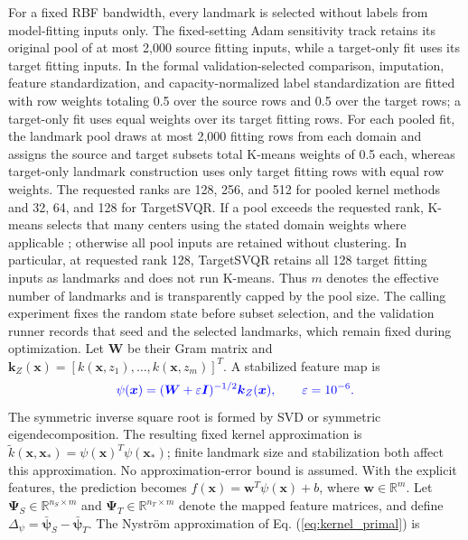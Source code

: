 \documentclass[a4paper]{cas-sc}
\begin{document}
{\color{blue}For a fixed RBF bandwidth, every landmark is selected without labels from model-fitting inputs only. The fixed-setting Adam sensitivity track retains its original pool of at most 2,000 source fitting inputs, while a target-only fit uses its target fitting inputs. In the formal validation-selected comparison, imputation, feature standardization, and capacity-normalized label standardization are fitted with row weights totaling 0.5 over the source rows and 0.5 over the target rows; a target-only fit uses equal weights over its target fitting rows. For each pooled fit, the landmark pool draws at most 2,000 fitting rows from each domain and assigns the source and target subsets total K-means weights of 0.5 each, whereas target-only landmark construction uses only target fitting rows with equal row weights. The requested ranks are 128, 256, and 512 for pooled kernel methods and 32, 64, and 128 for TargetSVQR. If a pool exceeds the requested rank, K-means selects that many centers using the stated domain weights where applicable \citep{zhang2010clustered}; otherwise all pool inputs are retained without clustering. In particular, at requested rank 128, TargetSVQR retains all 128 target fitting inputs as landmarks and does not run K-means. Thus $m$ denotes the effective number of landmarks and is transparently capped by the pool size. The calling experiment fixes the random state before subset selection, and the validation runner records that seed and the selected landmarks, which remain fixed during optimization. Let $\boldsymbol{W}$ be their Gram matrix and $\boldsymbol{k}_Z(\boldsymbol{x})=[k(\boldsymbol{x},z_1),\ldots,k(\boldsymbol{x},z_m)]^T$. A stabilized feature map is}
\begin{equation}
\label{eq:nystrom_feature}
{\color{blue}\psi(\boldsymbol{x})=(\boldsymbol{W}+\varepsilon\boldsymbol{I})^{-1/2}\boldsymbol{k}_Z(\boldsymbol{x}),\qquad \varepsilon=10^{-6}.}
\end{equation}
{\color{blue}The symmetric inverse square root is formed by SVD or symmetric eigendecomposition. The resulting fixed kernel approximation is $\widetilde{k}(\boldsymbol{x},\boldsymbol{x}_{*})=\psi(\boldsymbol{x})^T\psi(\boldsymbol{x}_{*})$; finite landmark size and stabilization both affect this approximation. No approximation-error bound is assumed.}
With the explicit features, the prediction becomes $f(\boldsymbol{x}) = \boldsymbol{w}^T \psi(\boldsymbol{x}) + b$, where $\boldsymbol{w} \in \mathbb{R}^m$. Let $\boldsymbol{\Psi}_S \in \mathbb{R}^{n_S \times m}$ and $\boldsymbol{\Psi}_T \in \mathbb{R}^{n_T \times m}$ denote the mapped feature matrices, and define $\Delta_{\psi} = \bar{\boldsymbol{\psi}}_S - \bar{\boldsymbol{\psi}}_T$. The Nystr\"{o}m approximation of Eq. (\ref{eq:kernel_primal}) is
\end{document}
